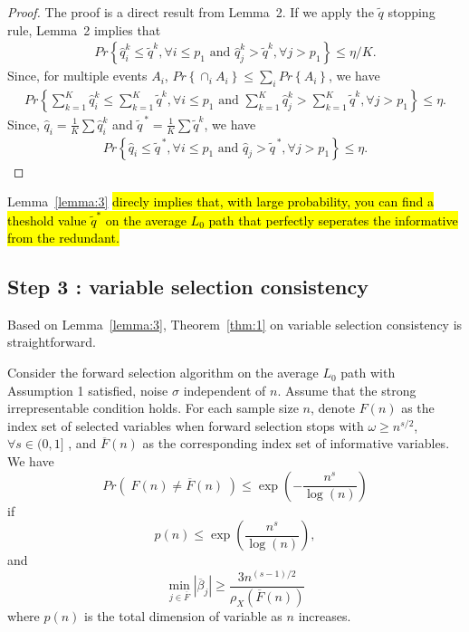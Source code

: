 \documentclass[11pt,review,authoryear]{elsarticle}
\begin{document}
\begin{appendices}
\begin{proof}
    The proof is a direct result from Lemma~2. If we apply the $\widetilde{q}$ stopping rule, Lemma~2 implies that
    \begin{eqnarray}
        Pr\left\{ \widehat{q}_i^k \leqslant \widetilde{q}^k,\forall i\leqslant p_1 \mbox{ and } \widehat{q}_j^k > \widetilde{q}^k,\forall j>p_1 \right\} \leqslant \eta/K.
    \end{eqnarray}
    Since, for multiple events $A_i$, $Pr\left\{ \cap_i A_i\right\} \leqslant \sum_i Pr\left\{ A_i\right\}$, we have
    \begin{eqnarray}
        Pr\left\{ \sum_{k=1}^K \widehat{q}_i^k \leqslant \sum_{k=1}^K \widetilde{q}^k,\forall i\leqslant p_1 \mbox{ and } \sum_{k=1}^K  \widehat{q}_j^k > \sum_{k=1}^K \widetilde{q}^k,\forall j>p_1 \right\} \leqslant \eta.
    \end{eqnarray}
    Since, $\widehat{q}_i = \frac{1}{K}\sum\widehat{q}_{i}^{k}$ and $\widetilde{q}^{\,*} = \frac{1}{K}\sum\widetilde{q}^k$, we have
    \begin{eqnarray}
        Pr\left\{ \widehat{q}_i \leqslant \widetilde{q}^{\,*},\forall i \leqslant p_1 \mbox{ and } \widehat{q}_j > \widetilde{q}^{\,*},\forall j>p_1 \right\} \leqslant \eta.
    \end{eqnarray}
\end{proof}
\noindent
Lemma~\ref{lemma:3} \hl{direcly implies that, with large probability, you can find a theshold value $\widetilde{q}^*$ on the average $L_0$ path that perfectly seperates the informative from the redundant.}


\subsection*{Step 3 : variable selection consistency}

Based on Lemma~\ref{lemma:3}, Theorem~\ref{thm:1} on variable selection consistency is straightforward.

\begin{theorem}
  Consider the forward selection algorithm on the average $L_0$ path with Assumption 1 satisfied, noise $\sigma$ independent of $n$. Assume that the strong irrepresentable condition holds. For each sample size $n$, denote $F\left( n \right)$ as the index set of selected variables when forward selection stops with $\omega\geqslant n^{s/2}$, $\forall s\in(0,1]$ , and $\overline{F}\left(n\right)$ as the corresponding index set of informative variables. We have
  \[
      Pr\left(\;F\left(n\right)\neq\overline{F}\left(n\right)\;\right)\leqslant \exp\left(-\frac{n^{s}}{\log\left(n\right)}\right)
  \]
  if
  \[
      p\left(n\right)\leqslant\exp\left(\frac{n^{s}}{\log\left(n\right)}\right),
  \]
  and
  \[
      \min_{j\in\overline{F}}\left|\overline{\beta}_{j}\right|\geqslant\frac{3n^{(s-1)/2}}{\rho_{X}\left(\overline{F}\left(n\right)\right)}
  \]
  where $p\left(n\right)$ is the total dimension of variable as $n$ increases.
  \label{thm:1}
\end{theorem}


\end{appendices}
\end{document}

